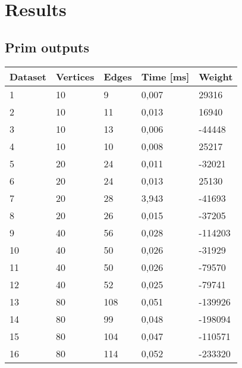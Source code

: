 \section{Results}

\subsection{Prim outputs}
\begin{longtable}{lllll}
    \textbf{Dataset} & \textbf{Vertices} & \textbf{Edges} & \textbf{Time [ms]} & \textbf{Weight} \\
    \endhead
    1                & 10             & 9              & 0,007       & 29316           \\
    2                & 10             & 11             & 0,013       & 16940           \\
    3                & 10             & 13             & 0,006       & -44448          \\
    4                & 10             & 10             & 0,008       & 25217           \\
    5                & 20             & 24             & 0,011       & -32021          \\
    6                & 20             & 24             & 0,013       & 25130           \\
    7                & 20             & 28             & 3,943       & -41693          \\
    8                & 20             & 26             & 0,015       & -37205          \\
    9                & 40             & 56             & 0,028       & -114203         \\
    10               & 40             & 50             & 0,026       & -31929          \\
    11               & 40             & 50             & 0,026       & -79570          \\
    12               & 40             & 52             & 0,025       & -79741          \\
    13               & 80             & 108            & 0,051       & -139926         \\
    14               & 80             & 99             & 0,048       & -198094         \\
    15               & 80             & 104            & 0,047       & -110571         \\
    16               & 80             & 114            & 0,052       & -233320         \\

\end{longtable}

